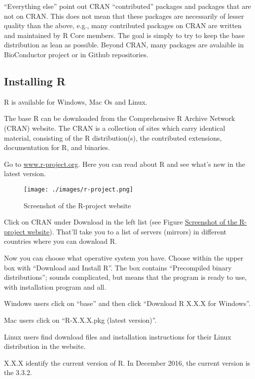 \documentclass[]{book}
\begin{document}
``Everything else'' point out CRAN ``contributed'' packages and packages
that are not on CRAN. This does not mean that these packages are
necessarily of lesser quality than the above, e.g., many contributed
packages on CRAN are written and maintained by R Core members. The goal
is simply to try to keep the base distribution as lean as possible.
Beyond CRAN, many packages are avalaible in BioConductor project or in
Github repositories.

\subsection{Installing R}\label{installing-r}

R is available for Windows, Mac Os and Linux.

The base R can be downloaded from the Comprehensive R Archive Network
(CRAN) website. The CRAN is a collection of sites which carry identical
material, consisting of the R distribution(s), the contributed
extensions, documentation for R, and binaries.

Go to \href{http://www.r-project.org/}{www.r-project.org}. Here you can
read about R and see what's new in the latest version.

\hypertarget{fig:ssSiteRproject}{}
\begin{figure}[htbp]
\centering
\texttt{[image: ./images/r-project.png]}
\caption{Screenshot of the R-project website\label{fig:ssSiteRproject}}
\end{figure}

Click on CRAN under Download in the left list (see Figure
\protect\hyperlink{fig:ssSiteRproject}{Screenshot of the R-project
website}). That'll take you to a list of servers (mirrors) in different
countries where you can download R.

Now you can choose what operative system you have. Choose within the
upper box with ``Download and Install R''. The box contains
``Precompiled binary distributions''; sounds complicated, but means that
the program is ready to use, with installation program and all.

Windows users click on ``base'' and then click ``Download R X.X.X for
Windows''.

Mac users click on ``R-X.X.X.pkg (latest version)''.

Linux users find download files and installation instructions for their
Linux distribution in the website.

X.X.X identify the current version of R. In December 2016, the current
version is the 3.3.2.
\end{document}
